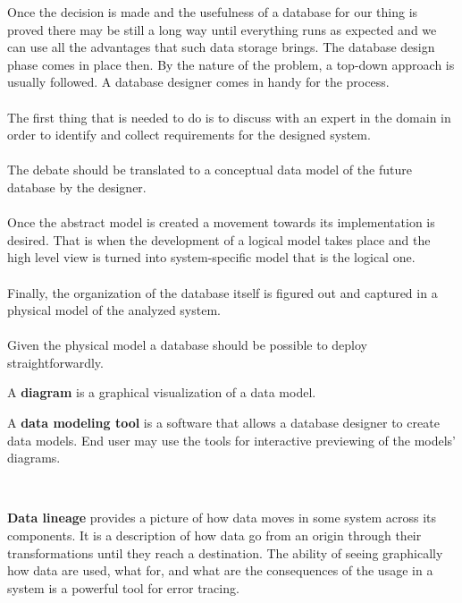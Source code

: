 \par
Once the decision is made and the usefulness of a database for our thing is proved there may be still a long way until everything runs as expected and we can use all the advantages that such data storage brings.
The database design phase comes in place then. By the nature of the problem, a top-down approach is usually followed.
A database designer comes in handy for the process. \\ \\
The first thing that is needed to do is to discuss with an expert in the domain  in order to identify and collect requirements for the designed system. \\ \\
The debate should be translated to a conceptual data model of the future database by the designer.\\ \\
Once the abstract model is created a movement towards its implementation is desired. That is when the development of a logical model takes place and the high level view is turned into system-specific model that is the logical one. \\ \\
Finally, the organization of the database itself is figured out and captured in a physical model of the analyzed system. \\ \\
Given the physical model a database should be possible to deploy straightforwardly. \\

\par 
A \textbf{diagram} is a graphical visualization of a data model. \\
\par
A \textbf{data modeling tool} is a software that allows a database designer to create data models. End user may use the tools for interactive previewing of the models' diagrams. \\

\par
{} \\

\par
\textbf{Data lineage} provides a picture of how data moves in some system across its components. It is a description of how data go from an origin through their transformations until they reach a destination. 
The ability of seeing graphically how data are used, what for, and what are the consequences of the usage in a system is a powerful tool for error tracing. \\

